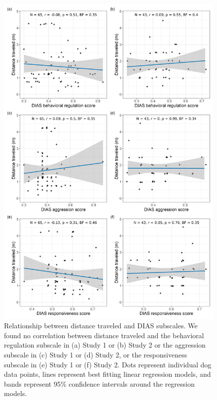 \documentclass[
  pub,floatsintext]{apa6}
\begin{document}
\begin{figure}

{\centering \includegraphics[width=0.75\linewidth]{figures/distance_dias_subscales} 

}

\caption{Relationship between distance traveled and DIAS subscales. We found no correlation between distance traveled and the behavioral regulation subscale in (a) Study 1 or (b) Study 2 or the aggression subscale in (c) Study 1 or (d) Study 2, or the responsiveness subscale in (e) Study 1 or (f) Study 2. Dots represent individual dog data points, lines represent best fitting linear regression models, and bands represent 95\% confidence intervals around the regression models. }\label{fig:dias-all}
\end{figure}
\end{document}
